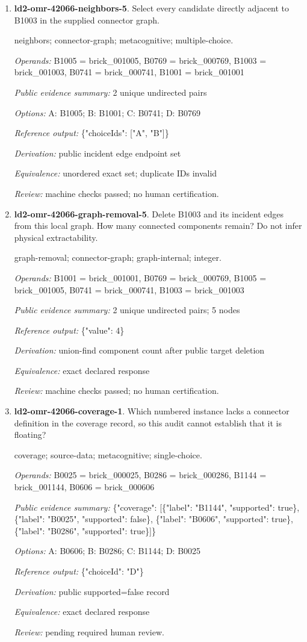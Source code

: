\begin{enumerate}
\item \textbf{ld2-omr-42066-neighbors-5}. Select every candidate directly adjacent to B1003 in the supplied connector graph.
\par{\small neighbors; connector-graph; metacognitive; multiple-choice.\par\textit{Operands:} B1005 = brick\_001005, B0769 = brick\_000769, B1003 = brick\_001003, B0741 = brick\_000741, B1001 = brick\_001001\par\textit{Public evidence summary:} 2 unique undirected pairs\par\textit{Options:} A: B1005; B: B1001; C: B0741; D: B0769\par\textit{Reference output:} \{"choiceIds": ["A", "B"]\}\par\textit{Derivation:} public incident edge endpoint set\par\textit{Equivalence:} unordered exact set; duplicate IDs invalid\par\textit{Review:} machine checks passed; no human certification.}
\item \textbf{ld2-omr-42066-graph-removal-5}. Delete B1003 and its incident edges from this local graph. How many connected components remain? Do not infer physical extractability.
\par{\small graph-removal; connector-graph; graph-internal; integer.\par\textit{Operands:} B1001 = brick\_001001, B0769 = brick\_000769, B1005 = brick\_001005, B0741 = brick\_000741, B1003 = brick\_001003\par\textit{Public evidence summary:} 2 unique undirected pairs; 5 nodes\par\textit{Reference output:} \{"value": 4\}\par\textit{Derivation:} union-find component count after public target deletion\par\textit{Equivalence:} exact declared response\par\textit{Review:} machine checks passed; no human certification.}
\item \textbf{ld2-omr-42066-coverage-1}. Which numbered instance lacks a connector definition in the coverage record, so this audit cannot establish that it is floating?
\par{\small coverage; source-data; metacognitive; single-choice.\par\textit{Operands:} B0025 = brick\_000025, B0286 = brick\_000286, B1144 = brick\_001144, B0606 = brick\_000606\par\textit{Public evidence summary:} \{"coverage": [\{"label": "B1144", "supported": true\}, \{"label": "B0025", "supported": false\}, \{"label": "B0606", "supported": true\}, \{"label": "B0286", "supported": true\}]\}\par\textit{Options:} A: B0606; B: B0286; C: B1144; D: B0025\par\textit{Reference output:} \{"choiceId": "D"\}\par\textit{Derivation:} public supported=false record\par\textit{Equivalence:} exact declared response\par\textit{Review:} pending required human review.}

\end{enumerate}
